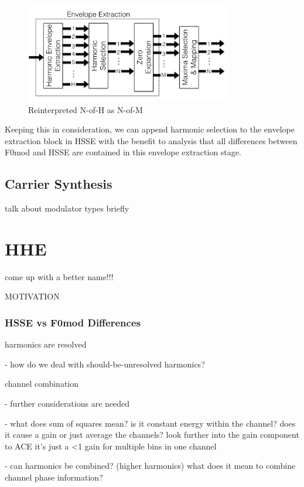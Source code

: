 \documentclass [11pt, proquest] {uwthesis}[2015/03/03]
\begin{document}
\begin{figure}[!ht]
  \centering
    \includegraphics[width=0.8\textwidth]{HSSE_selection_newTEMP}   
    \caption{Reinterpreted N-of-H as N-of-M}
\end{figure}

Keeping this in consideration, we can append harmonic selection to the envelope extraction block in HSSE with the benefit to analysis that all differences between F0mod and HSSE are contained in this envelope extraction stage.

\section{Carrier Synthesis}

talk about modulator types briefly





\chapter{HHE}
come up with a better name!!!

MOTIVATION

\subsection{HSSE vs F0mod Differences}

harmonics are resolved

 - how do we deal with should-be-unresolved harmonics?

channel combination

 - further considerations are needed

 - what does sum of squares mean? is it constant energy within the channel?  does it cause a gain or just average the channels?  look further into the gain component to ACE
 	it's just a <1 gain for multiple bins in one channel

 - can harmonics be combined? (higher harmonics) what does it mean to combine channel phase information?
\end{document}
